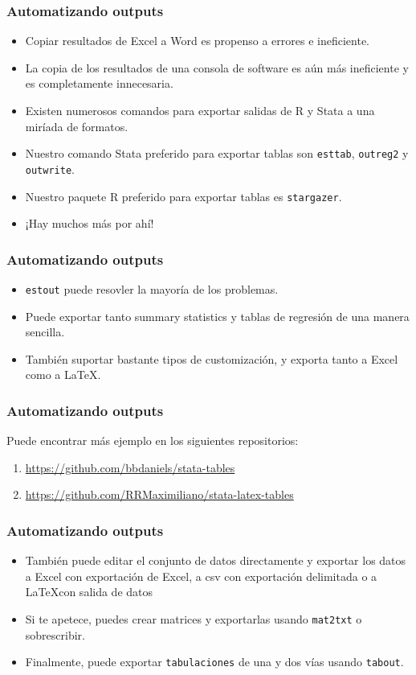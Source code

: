 \documentclass[10pt, aspectratio=169, compress]{beamer}
\begin{document}
\begin{frame}
	\frametitle{Automatizando outputs}
	\begin{itemize}[<+->]
		\item Copiar resultados de Excel a Word es propenso a errores e ineficiente.
		\item La copia de los resultados de una consola de software es aún más ineficiente y es completamente innecesaria.
		\item Existen numerosos comandos para exportar salidas de R y Stata a una miríada de formatos.
		\item Nuestro comando Stata preferido para exportar tablas son \texttt{esttab}, \texttt{outreg2} y \texttt{outwrite}.
		\item Nuestro paquete R preferido para exportar tablas es \texttt{stargazer}.
		\item ¡Hay muchos más por ahí!
	\end{itemize}	
\end{frame}
\begin{frame}
	\frametitle{Automatizando outputs}
	\begin{itemize}
		\item \texttt{estout} puede resovler la mayoría de los problemas. 
		\item Puede exportar tanto summary statistics y tablas de regresión de una manera sencilla. 
		\item También suportar bastante tipos de customización, y exporta tanto a Excel como a \LaTeX.
	\end{itemize}
\end{frame}
\begin{frame}
	\frametitle{Automatizando outputs}
	
	Puede encontrar más ejemplo en los siguientes repositorios: 
	\begin{enumerate}
		\item \href{https://github.com/bbdaniels/stata-tables}{https://github.com/bbdaniels/stata-tables}
		\item \href{https://github.com/RRMaximiliano/stata-latex-tables}{https://github.com/RRMaximiliano/stata-latex-tables}
	\end{enumerate}
\end{frame}
\begin{frame}
	\frametitle{Automatizando outputs}
	\begin{itemize}
		\item También puede editar el conjunto de datos directamente y exportar los datos a Excel con exportación de Excel, a csv con exportación delimitada o a \LaTeX con salida de datos
		\item Si te apetece, puedes crear matrices y exportarlas usando \texttt{mat2txt} o sobrescribir.
		\item Finalmente, puede exportar \texttt{tabulaciones} de una y dos vías usando \texttt{tabout}.
	\end{itemize}	
\end{frame}
\end{document}
